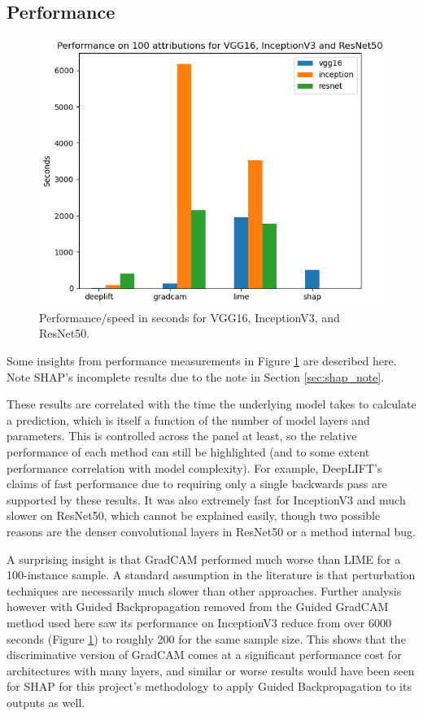 \documentclass[main]{subfiles}
\begin{document}
\subsection{Performance} \label{sec:perform}


\begin{figure}[h]\centering
\vfill
\includegraphics[scale=0.6]{performance.png}
\caption{Performance/speed in seconds for VGG16, InceptionV3, and ResNet50. }
\label{performFig}
\vfill
\end{figure}

\noindent Some insights from performance measurements in Figure \ref{performFig} are described here. Note SHAP's incomplete results due to the note in Section \ref{sec:shap_note}.

These results are correlated with the time the underlying model takes to calculate a prediction, which is itself a function of the number of model layers and parameters. This is controlled across the panel at least, so the relative performance of each method can still be highlighted (and to some extent performance correlation with model complexity). For example, DeepLIFT's claims of fast performance due to requiring only a single backwards pass are supported by these results. It was also extremely fast for InceptionV3 and much slower on ResNet50, which cannot be explained easily, though two possible reasons are the denser convolutional layers in ResNet50 or a method internal bug.

A surprising insight is that GradCAM performed much worse than LIME for a 100-instance sample. A standard assumption in the literature is that perturbation techniques are necessarily much slower than other approaches. Further analysis however with Guided Backpropagation removed from the Guided GradCAM method used here saw its performance on InceptionV3 reduce from over 6000 seconds (Figure \ref{performFig}) to roughly 200 for the same sample size. This shows that the discriminative version of GradCAM comes at a significant performance cost for architectures with many layers, and similar or worse results would have been seen for SHAP for this project's methodology to apply Guided Backpropagation to its outputs as well.
\end{document}
